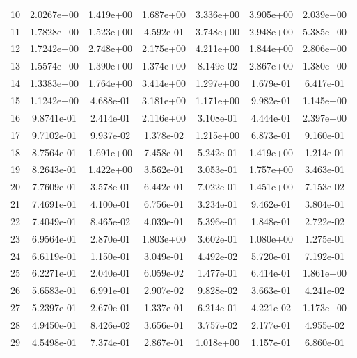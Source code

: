 \begin{longtable}{c c c c c c c}
10 & 2.0267e+00 & 1.419e+00 & 1.687e+00 & 3.336e+00 & 3.905e+00 & 2.039e+00 \\
11 & 1.7828e+00 & 1.523e+00 & 4.592e-01 & 3.748e+00 & 2.948e+00 & 5.385e+00 \\
12 & 1.7242e+00 & 2.748e+00 & 2.175e+00 & 4.211e+00 & 1.844e+00 & 2.806e+00 \\
13 & 1.5574e+00 & 1.390e+00 & 1.374e+00 & 8.149e-02 & 2.867e+00 & 1.380e+00 \\
14 & 1.3383e+00 & 1.764e+00 & 3.414e+00 & 1.297e+00 & 1.679e-01 & 6.417e-01 \\
15 & 1.1242e+00 & 4.688e-01 & 3.181e+00 & 1.171e+00 & 9.982e-01 & 1.145e+00 \\
16 & 9.8741e-01 & 2.414e-01 & 2.116e+00 & 3.108e-01 & 4.444e-01 & 2.397e+00 \\
17 & 9.7102e-01 & 9.937e-02 & 1.378e-02 & 1.215e+00 & 6.873e-01 & 9.160e-01 \\
18 & 8.7564e-01 & 1.691e+00 & 7.458e-01 & 5.242e-01 & 1.419e+00 & 1.214e-01 \\
19 & 8.2643e-01 & 1.422e+00 & 3.562e-01 & 3.053e-01 & 1.757e+00 & 3.463e-01 \\
20 & 7.7609e-01 & 3.578e-01 & 6.442e-01 & 7.022e-01 & 1.451e+00 & 7.153e-02 \\
21 & 7.4691e-01 & 4.100e-01 & 6.756e-01 & 3.234e-01 & 9.462e-01 & 3.804e-01 \\
22 & 7.4049e-01 & 8.465e-02 & 4.039e-01 & 5.396e-01 & 1.848e-01 & 2.722e-02 \\
23 & 6.9564e-01 & 2.870e-01 & 1.803e+00 & 3.602e-01 & 1.080e+00 & 1.275e-01 \\
24 & 6.6119e-01 & 1.150e-01 & 3.049e-01 & 4.492e-02 & 5.720e-01 & 7.192e-01 \\
25 & 6.2271e-01 & 2.040e-01 & 6.059e-02 & 1.477e-01 & 6.414e-01 & 1.861e+00 \\
26 & 5.6583e-01 & 6.991e-01 & 2.907e-02 & 9.828e-02 & 3.663e-01 & 4.241e-02 \\
27 & 5.2397e-01 & 2.670e-01 & 1.337e-01 & 6.214e-01 & 4.221e-02 & 1.173e+00 \\
28 & 4.9450e-01 & 8.426e-02 & 3.656e-01 & 3.757e-02 & 2.177e-01 & 4.955e-02 \\
29 & 4.5498e-01 & 7.374e-01 & 2.867e-01 & 1.018e+00 & 1.157e-01 & 6.860e-01 \\
\end{longtable}


